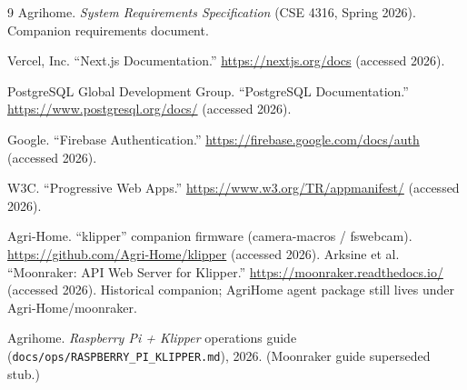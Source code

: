 \documentclass[11pt,letterpaper]{article}
\begin{document}
{}
\begin{thebibliography}{9}
Agrihome. \textit{System Requirements Specification} (CSE 4316, Spring 2026). Companion requirements document.

Vercel, Inc. ``Next.js Documentation.'' \url{https://nextjs.org/docs} (accessed 2026).

PostgreSQL Global Development Group. ``PostgreSQL Documentation.'' \url{https://www.postgresql.org/docs/} (accessed 2026).

Google. ``Firebase Authentication.'' \url{https://firebase.google.com/docs/auth} (accessed 2026).

W3C. ``Progressive Web Apps.'' \url{https://www.w3.org/TR/appmanifest/} (accessed 2026).

Agri-Home. ``klipper'' companion firmware (camera-macros / fswebcam). \url{https://github.com/Agri-Home/klipper} (accessed 2026).
Arksine et al. ``Moonraker: API Web Server for Klipper.'' \url{https://moonraker.readthedocs.io/} (accessed 2026). Historical companion; AgriHome agent package still lives under Agri-Home/moonraker.

Agrihome. \textit{Raspberry Pi + Klipper} operations guide (\texttt{docs/ops/RASPBERRY\_PI\_KLIPPER.md}), 2026. (Moonraker guide superseded stub.)
\end{thebibliography}
\end{document}
